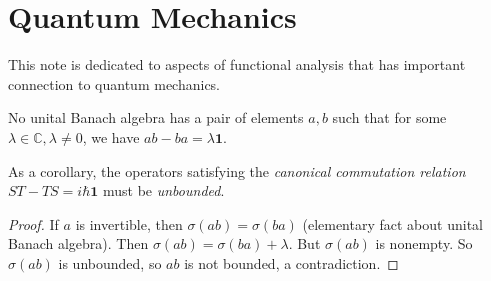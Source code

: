 
\section{Quantum Mechanics}


This note is dedicated to aspects of functional analysis that has important connection to quantum mechanics.

\begin{proposition}
	\label{prop:NoBoundedCommutation}
	No unital Banach algebra has a pair of elements $a, b$ such that for some $\lambda \in \mathbb{C}, \lambda\neq 0$, we have $ab - ba = \lambda \mathbf{1}$.

	As a corollary, the operators satisfying the \textit{canonical commutation relation} $ST - TS = i \hbar \mathbf{1}$ must be \textit{unbounded}.
\end{proposition}
\begin{proof}
	If $a$ is invertible, then $\sigma(ab) = \sigma(ba)$ (elementary fact about unital Banach algebra). Then $\sigma(a b) = \sigma(b a ) + \lambda$. But $\sigma(a b)$ is nonempty. So $\sigma(a b)$ is unbounded, so $ab$ is not bounded, a contradiction.
\end{proof}

